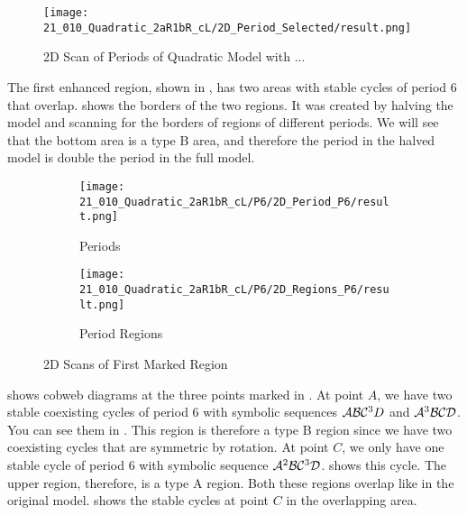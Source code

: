 \begin{figure}
    \centering
    \texttt{[image: 21\_010\_Quadratic\_2aR1bR\_cL/2D\_Period\_Selected/result.png]}
    \caption{2D Scan of Periods of Quadratic Model with ...}
    \label{fig:quadratic.full.2aR1bR_cL.2d.full}
\end{figure}

The first enhanced region, shown in , has two areas with stable cycles of period 6 that overlap.
 shows the borders of the two regions.
It was created by halving the model and scanning for the borders of regions of different periods.
We will see that the bottom area is a type B area, and therefore the period in the halved model is double the period in the full model.

\begin{figure}
    \centering
    \begin{subfigure}{0.4\textwidth}
        \centering
        \texttt{[image: 21\_010\_Quadratic\_2aR1bR\_cL/P6/2D\_Period\_P6/result.png]}
        \caption{Periods}
        \label{fig:quadratic.full.2aR1bR_cL.2d.1}
    \end{subfigure}
    \begin{subfigure}{0.4\textwidth}
        \centering
        \texttt{[image: 21\_010\_Quadratic\_2aR1bR\_cL/P6/2D\_Regions\_P6/result.png]}
        \caption{Period Regions}
        \label{fig:quadratic.regions.2aR1bR_cL.2d.1}
    \end{subfigure}
    \caption{2D Scans of First Marked Region}
\end{figure}

 shows cobweb diagrams at the three points marked in .
At point $A$, we have two stable coexisting cycles of period 6 with symbolic sequences $\mathcal{A}\mathcal{B}\mathcal{C}^3D$ and $\mathcal{A}^3\mathcal{B}\mathcal{C}\mathcal{D}$.
You can see them in .
This region is therefore a type B region since we have two coexisting cycles that are symmetric by rotation.
At point $C$, we only have one stable cycle of period 6 with symbolic sequence $\mathcal{A}^2\mathcal{B}\mathcal{C}^3\mathcal{D}$.
 shows this cycle.
The upper region, therefore, is a type A region.
Both these regions overlap like in the original model.
 shows the stable cycles at point $C$ in the overlapping area.

